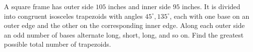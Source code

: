 A square frame has outer side $105$ inches and inner side $95$ inches. It is divided into congruent isosceles trapezoids with angles $45^\circ,135^\circ$, each with one base on an outer edge and the other on the corresponding inner edge. Along each outer side an odd number of bases alternate long, short, long, and so on. Find the greatest possible total number of trapezoids.
